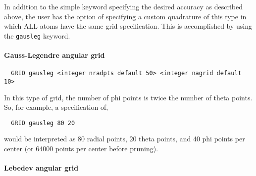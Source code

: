 In addition to the simple keyword specifying the desired accuracy as
described above, the user has the option of specifying a custom
quadrature of this type in which ALL atoms have the same grid
specification.  This is accomplished by using the \verb+gausleg+ keyword.

\paragraph{Gauss-Legendre angular grid}

\begin{verbatim}
  GRID gausleg <integer nradpts default 50> <integer nagrid default 10> 
\end{verbatim}

In this type of grid, the number of phi points is twice the number of
theta points. So, for example, a specification of,
\begin{verbatim}
  GRID gausleg 80 20
\end{verbatim}
would be interpreted as 80 radial points, 20 theta points, and 40
phi points per center (or 64000 points per center before pruning).

\paragraph{Lebedev angular grid}

